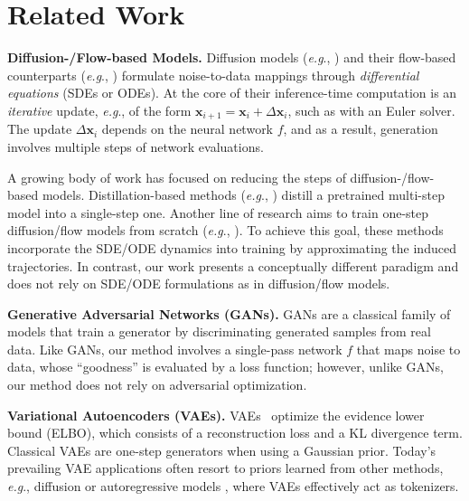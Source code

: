 \documentclass{article}
\newcommand{\vv}[1]{\mathbf{#1}}
\newcommand{\x}{\vv{x}}
\renewcommand{\paragraph}[1]{\vspace{.05em}\noindent\textbf{#1}}
\def\onedot{.}
\def\eg{\emph{e.g}\onedot} \def\Eg{\emph{E.g}\onedot}
\theoremstyle{plain}
\theoremstyle{definition}
\theoremstyle{remark}
\begin{document}
\section{Related Work}

\paragraph{Diffusion-/Flow-based Models.}
Diffusion models (\eg, \citealt{sohl2015deep,ho2020denoising,song2020score}) and their flow-based counterparts (\eg, \citealt{lipman2022flow,liu2022flow,albergo2023stochastic}) formulate noise-to-data mappings through \textit{differential equations} (SDEs or ODEs). At the core of their inference-time computation is an \textit{\mbox{iterative}} update, \eg, of the form $\x_{i+1}=\x_{i} + \Delta\x_{i}$, such as with an Euler solver. The update $\Delta\x_{i}$ depends on the neural network $f$, and as a result, generation involves multiple steps of network evaluations.

A growing body of work has focused on reducing the steps of diffusion-/flow-based models.
Distillation-based methods
(\eg, \citealt{salimans2022progressive,luo2023diff,yin2024one,zhou2024score}) distill a pretrained multi-step model into a single-step one.
Another line of research  aims to train one-step diffusion/flow models from scratch (\eg, \citealt{song2023consistency,frans2024one,boffi2025flow,geng2025mean}). To achieve this goal, these methods incorporate the SDE/ODE dynamics into training by approximating the induced trajectories.
In contrast, our work presents a conceptually different paradigm and does not rely on SDE/ODE formulations as in diffusion/flow models.

\paragraph{Generative Adversarial Networks (GANs).}
GANs \cite{goodfellow2014generative} are a classical family of models that train a generator by discriminating generated samples from real data.
Like GANs, our method involves a single-pass network $f$ that maps noise to data, whose ``goodness'' is evaluated by a loss function; however, unlike GANs, our method does not rely on adversarial optimization.

\paragraph{Variational Autoencoders (VAEs).}
VAEs~\cite{kingma2013auto} optimize the evidence lower bound (ELBO), which consists of a reconstruction loss and a KL divergence term.
Classical VAEs are one-step generators when using a Gaussian prior. Today's prevailing VAE applications often resort to priors learned from other methods, \eg, diffusion \cite{rombach2022high} or autoregressive models \cite{esser2021taming}, where VAEs effectively act as tokenizers.
\end{document}
